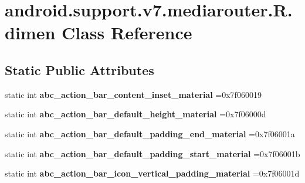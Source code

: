 \hypertarget{classandroid_1_1support_1_1v7_1_1mediarouter_1_1R_1_1dimen}{}\section{android.\+support.\+v7.\+mediarouter.\+R.\+dimen Class Reference}
\label{classandroid_1_1support_1_1v7_1_1mediarouter_1_1R_1_1dimen}
\subsection*{Static Public Attributes}
\begin{DoxyCompactItemize}
\item 
\mbox{\label{classandroid_1_1support_1_1v7_1_1mediarouter_1_1R_1_1dimen_aca16ce1edacd60c0e447a27c9f90ee38}} 
static int {\bfseries abc\+\_\+action\+\_\+bar\+\_\+content\+\_\+inset\+\_\+material} =0x7f060019
\item 
\mbox{\label{classandroid_1_1support_1_1v7_1_1mediarouter_1_1R_1_1dimen_afe8ae461e05a138a506354ec385065be}} 
static int {\bfseries abc\+\_\+action\+\_\+bar\+\_\+default\+\_\+height\+\_\+material} =0x7f06000d
\item 
\mbox{\label{classandroid_1_1support_1_1v7_1_1mediarouter_1_1R_1_1dimen_a2746dc04df4bf3e57c98089f5c6bd632}} 
static int {\bfseries abc\+\_\+action\+\_\+bar\+\_\+default\+\_\+padding\+\_\+end\+\_\+material} =0x7f06001a
\item 
\mbox{\label{classandroid_1_1support_1_1v7_1_1mediarouter_1_1R_1_1dimen_a3393e15f407bc3591a7598d5f5f6ad15}} 
static int {\bfseries abc\+\_\+action\+\_\+bar\+\_\+default\+\_\+padding\+\_\+start\+\_\+material} =0x7f06001b
\item 
\mbox{\label{classandroid_1_1support_1_1v7_1_1mediarouter_1_1R_1_1dimen_a84912276fb4f5249cc2b3b4e0295569c}} 
static int {\bfseries abc\+\_\+action\+\_\+bar\+\_\+icon\+\_\+vertical\+\_\+padding\+\_\+material} =0x7f06001d
\item 

\end{DoxyCompactItemize}
